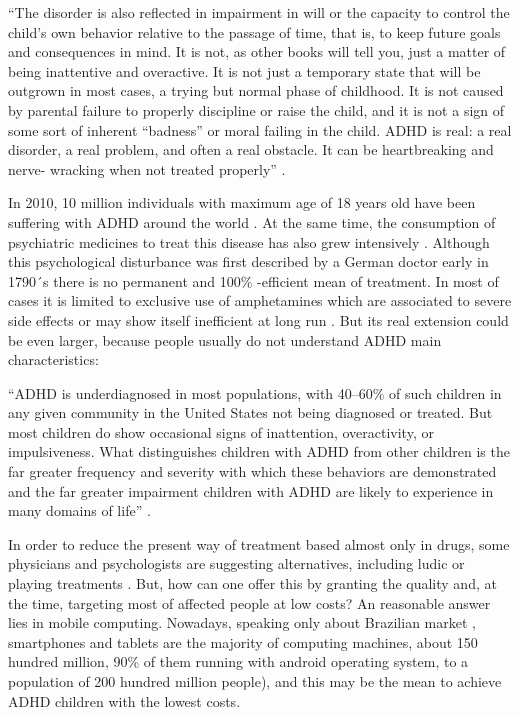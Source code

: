 ``The disorder is also reflected in impairment in will or the capacity to control the child’s own behavior relative to the passage of time, that is, to keep future goals and consequences in mind. It is not, as other books will tell you, just a matter of being inattentive and overactive. It is not just a temporary state that will be outgrown in most cases, a trying but normal phase of childhood. It is not caused by parental failure to properly discipline or raise the child, and it is not a sign of some sort of inherent “badness” or moral failing in the child. ADHD is real: a real disorder, a real problem, and often a real obstacle. It can be heartbreaking and nerve- wracking when not treated properly'' \citep{RBarkley}.

In 2010, 10 million individuals with maximum age of 18 years old have been suffering with ADHD around the world \citep{Psychoanalytic}. At the same time, the consumption of psychiatric medicines to treat this disease has also grew intensively  \citep{Psychoanalytic}. Although this psychological disturbance was first described by a German doctor early in 1790´s there is no permanent and 100\% -efficient mean of treatment. In most of cases it is limited to exclusive use of amphetamines which are associated to severe side effects or may show itself inefficient at long run  \citep{Psychoanalytic}. But its real extension  could be even larger, because people usually  do not understand ADHD main characteristics:

``ADHD is underdiagnosed in most populations, with 40–60\% of such children in any given community in the United States not being diagnosed or treated. But most children do show occasional signs of inattention, overactivity, or impulsiveness. What distinguishes children with ADHD from other children is the far greater frequency and severity with which these behaviors are demonstrated and the far greater impairment children with ADHD are likely to experience in many domains of life'' \citep{RBarkley}.

In order to reduce the present way of treatment based almost only in drugs, some physicians and psychologists are suggesting alternatives, including ludic or playing treatments \citep{Psychoanalytic, brainGames}. But, how can one offer this by granting the quality and, at the time, targeting most of affected people at low costs? An reasonable answer lies in mobile computing. Nowadays, speaking only about Brazilian market \citep{idcTablets}, smartphones and tablets are the majority of computing machines, about 150 hundred million, 90\% of them running with android operating system, to a population of 200 hundred million people\citep{idcTablets}), and this may be the mean to achieve ADHD children with the lowest costs. 


